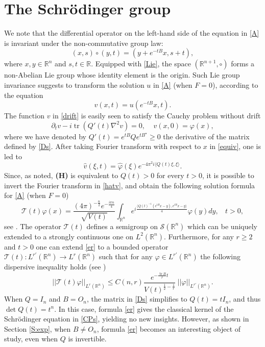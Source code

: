 \documentclass[11pt,letter]{amsart}
\def \R {\mathbb{R}}
\def \vf{\varphi}
\newcommand{\Rn}{\mathbb R^n}
\newcommand{\p}{\partial}
\numberwithin{equation}{section}
\newcommand{\tr}{\operatorname{tr}}
\newcommand{\sa}{\langle}
\newcommand{\da}{\rangle}
\numberwithin{equation}{section}
\begin{document}
\section{The Schr\"odinger group}\label{S:ext}

We note that the differential operator on the left-hand side of the equation in \eqref{A}  is  invariant under the non-commutative group law: 
\begin{equation}\label{Lie}
(x,s)\circ (y,t) = (y+ e^{-tB}x,s+t),
\end{equation}
where $x, y\in \Rn$ and $s, t\in \R$. Equipped with \eqref{Lie}, the space $(\R^{n+1},\circ)$ forms a non-Abelian Lie group whose identity element is the origin. Such Lie group invariance suggests to transform the solution $u$ in \eqref{A} (when $F = 0$), according to the equation
\begin{equation}\label{drift}
v(x,t) = u(e^{- t B} x,t).
\end{equation}
The function $v$ in \eqref{drift} is easily seen to satisfy the Cauchy problem without drift 
\begin{equation}\label{equiv}
\p_t v - i \operatorname{tr}(Q'(t) \nabla^2 v) = 0,\ \ \ \ \ v(x,0) = \vf(x),
\end{equation}
where we have denoted by $Q'(t) = e^{tB} Q e^{tB^\star} \ge 0$ the derivative of the matrix defined by \eqref{Ds}.
After taking Fourier transform with respect to $x$ in \eqref{equiv}, one is  led to
\begin{equation}\label{hatv}
\hat v(\xi,t) = \hat \vf(\xi) e^{-4\pi^2 i \sa Q(t) \xi,\xi\da}.
\end{equation}
Since, as noted, \textbf{(H)} is equivalent to $Q(t)>0$ for every $t>0$, it is possible to invert the Fourier transform in \eqref{hatv}, and obtain the following solution formula for \eqref{A} (when $F = 0$) 
\begin{equation}\label{er}
\mathcal T(t) \vf(x)  = 
 \frac{(4\pi
)^{-\frac{n}{2}}e^{-\frac{i \pi n}4}}{\sqrt{V(t)}}   \int_{\Rn} e^{i \frac{\sa Q(t)^{-1}(e^{tB}x-y),e^{tB}x - y\da}{4}} \vf(y) dy,\ \ \ \ t>0, 
\end{equation}
see \cite[Prop.2.4]{GL}. The operator $\mathcal T(t)$ defines a semigroup on $\mathscr S(\Rn)$ which can be uniquely extended to a strongly continuous one on $L^2(\Rn)$. Furthermore, for any $r\ge 2$ and $t>0$ one can extend \eqref{er} to a  bounded operator $\mathcal T(t) : L^{r'}(\Rn)\to L^{r}(\Rn)$ such that for any $\vf\in L^{r'}(\Rn)$ the following dispersive inequality holds (see \cite[Theor. 4.1]{GL})
\begin{equation}\label{dis}
||\mathcal T(t) \vf||_{L^{r}(\Rn)} \le C(n,r)  \frac{e^{-\frac{\tr B}{r} t}}{V(t)^{\frac 12 - \frac 1{r}}}\ ||\vf||_{L^{r'}(\Rn)}.
\end{equation} 
When $Q = I_n$ and $B = O_n$, the matrix in \eqref{Ds} simplifies to $Q(t) = t I_n$, and thus $\det Q(t) = t^n$. In this case, formula \eqref{er} gives the classical kernel of the  Schr\"odinger equation  in \eqref{CPs}, yielding no new insights. However, as shown in Section \ref{S:exp}, when $B\not= O_n$, formula \eqref{er} becomes an interesting object of study, even when $Q$ is invertible. 
\end{document}
